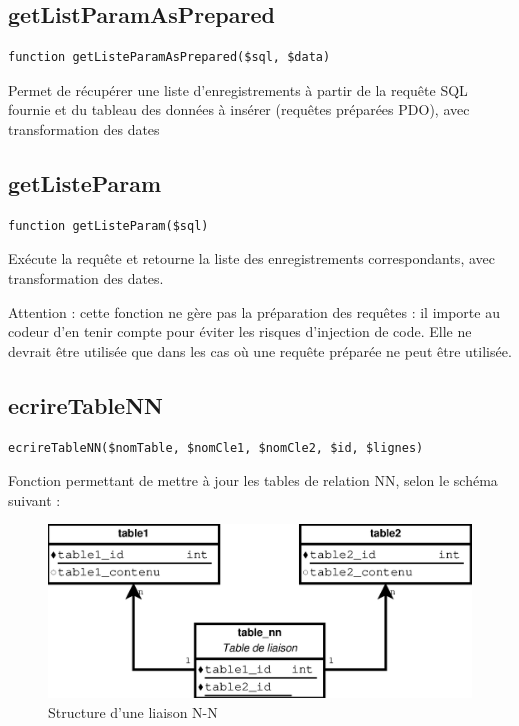 \subsection{getListParamAsPrepared}

\begin{lstlisting}
function getListeParamAsPrepared($sql, $data)
\end{lstlisting}

Permet de récupérer une liste d'enregistrements à partir de la requête SQL fournie et du tableau des données à insérer (requêtes préparées PDO), avec transformation des dates

\subsection{getListeParam}
\begin{lstlisting}
function getListeParam($sql)
\end{lstlisting}

Exécute la requête et retourne la liste des enregistrements correspondants, avec transformation des dates.

Attention : cette fonction ne gère pas la préparation des requêtes : il importe au codeur d'en tenir compte pour éviter les risques d'injection de code. Elle ne devrait être utilisée que dans les cas où une requête préparée ne peut être utilisée.

\subsection{ecrireTableNN}

\begin{lstlisting}
ecrireTableNN($nomTable, $nomCle1, $nomCle2, $id, $lignes)
\end{lstlisting}

Fonction permettant de mettre à jour les tables de relation NN, selon le schéma suivant :

\begin{figure}[H]
\centering
\includegraphics[width=0.8\linewidth]{dessin/schema-nn}
\caption{Structure d'une liaison N-N}
\end{figure}

